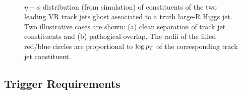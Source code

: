 \begin{figure}[htbp!]
    \begin{center}
        \\
    \end{center}
    \caption{ $\eta-\phi$ distribution (from simulation) of constituents of the two leading \pt VR track jets ghost associated to a truth large-R Higgs jet.
        Two illustrative cases are shown: (a) clean separation of track jet constituents and (b) pathogical overlap.
        The radii of the filled red/blue circles are proportional to $\log{\ensuremath{p_{T}}}$ of the corresponding track jet constituent.
    }
    \label{fig:vr_contain}
\end{figure}

\subsection{Trigger Requirements}
\label{subsec:trig}

